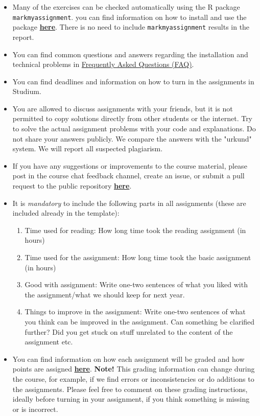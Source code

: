 \begin{itemize}
\begin{enumerate}
\end{enumerate}
\item Many of the exercises can be checked automatically using the R package \\ \texttt{markmyassignment}. you can find information on how to install and use the package \href{https://cran.r-project.org/web/packages/markmyassignment/vignettes/markmyassignment.html}{\textbf{here}}. There is no need to include \texttt{markmyassignment} results in the report.
\item You can find common questions and answers regarding the installation and technical problems in \href{https://github.com/MansMeg/BSDA/blob/main/FAQ.md}{Frequently Asked Questions (FAQ)}.
\item You can find deadlines and information on how to turn in the assignments in Studium.
\item You are allowed to discuss assignments with your friends, but it is not permitted to copy solutions directly from other students or the internet. Try to solve the actual assignment problems with your code and explanations. Do not share your answers publicly. We compare the answers with the "urkund" system. We will report all suspected plagiarism.
\item If you have any suggestions or improvements to the course material, please post in the course chat feedback channel, create an issue, or submit a pull request to the public repository \href{https://github.com/MansMeg/BSDA/issues}{\textbf{here}}.
\item It is \emph{mandatory} to include the following parts in all assignments (these are included already in the template):
\begin{enumerate}
\item Time used for reading: How long time took the reading assignment (in hours)
\item Time used for the assignment: How long time took the basic assignment (in hours)
\item Good with assignment: Write one-two sentences of what you liked with the assignment/what we should keep for next year.
\item Things to improve in the assignment: Write one-two sentences of what you think can be improved in the assignment. Can something be clarified further? Did you get stuck on stuff unrelated to the content of the assignment etc.
\end{enumerate}
\item You can find information on how each assignment will be graded and how points are assigned \href{https://github.com/MansMeg/BSDA/tree/main/grading}{\textbf{here}}. \textbf{Note!} This grading information can change during the course, for example, if we find errors or inconsistencies or do additions to the assignments. Please feel free to comment on these grading instructions, ideally before turning in your assignment, if you think something is missing or is incorrect.

\end{itemize}
